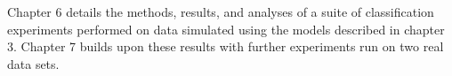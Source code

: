 Chapter 6 details the methods, results, and analyses of a suite of classification experiments
performed on data simulated using the models described in chapter 3. Chapter 7 builds upon these
results with further experiments run on two real data sets.


